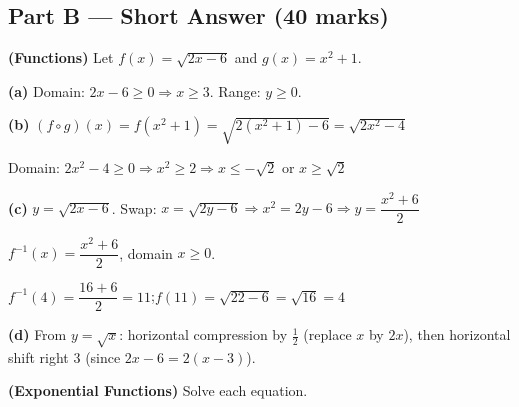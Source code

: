 \documentclass[addpoints]{exam}
\begin{document}
\begin{questions}
\section*{Part B --- Short Answer (40 marks)}

\question \textbf{(Functions)} Let $f(x) = \sqrt{2x - 6}$ and $g(x) = x^2 + 1$.
\begin{solution}[10cm]
\textbf{(a)} Domain: $2x - 6 \geq 0 \Rightarrow x \geq 3$. Range: $y \geq 0$.

\textbf{(b)} $(f \circ g)(x) = f(x^2+1) = \sqrt{2(x^2+1)-6} = \sqrt{2x^2-4}$

Domain: $2x^2 - 4 \geq 0 \Rightarrow x^2 \geq 2 \Rightarrow x \leq -\sqrt{2}$ or $x \geq \sqrt{2}$

\textbf{(c)} $y = \sqrt{2x-6}$. Swap: $x = \sqrt{2y-6} \Rightarrow x^2 = 2y-6
\Rightarrow y = \dfrac{x^2+6}{2}$

$f^{-1}(x) = \dfrac{x^2+6}{2}$, domain $x \geq 0$.

$f^{-1}(4) = \dfrac{16+6}{2} = 11$;\quad $f(11) = \sqrt{22-6} = \sqrt{16} = 4$ \checkmark

\textbf{(d)} From $y=\sqrt{x}$: horizontal compression by $\tfrac{1}{2}$ (replace $x$ by $2x$),
then horizontal shift right 3 (since $2x - 6 = 2(x-3)$).
\end{solution}

\question \textbf{(Exponential Functions)} Solve each equation.
\end{questions}
\end{document}
